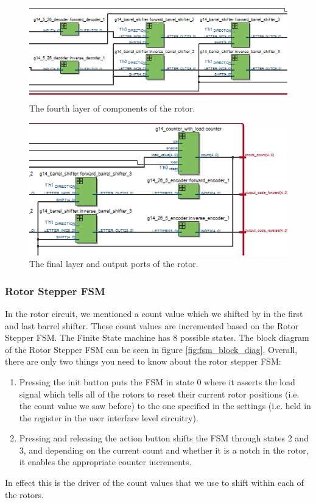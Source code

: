 \documentclass{article}
\begin{document}
\begin{figure}[ht!]
    \centering
    \includegraphics[scale=0.6]{rotor_4.PNG}
    \caption{The fourth layer of components of the rotor.}
    \label{fig:rotor_4}
\end{figure}

\begin{figure}[ht!]
    \centering
    \includegraphics[scale=0.7]{rotor_5.PNG}
    \caption{The final layer and output ports of the rotor. }
    \label{fig:rotor_5}
\end{figure}


\subsubsection{Rotor Stepper FSM}
In the rotor circuit, we mentioned a count value which we shifted by in the first and last barrel shifter. These count values are incremented based on the Rotor Stepper FSM. The Finite State machine has 8 possible states. The block diagram of the Rotor Stepper FSM can be seen in figure \ref{fig:fsm_block_diag}. Overall, there are only two things you need to know about the rotor stepper FSM: 
\begin{enumerate}
    \item Pressing the init button puts the FSM in state 0 where it asserts the load signal which tells all of the rotors to reset their current rotor positions (i.e. the count value we saw before) to the one specified in the settings (i.e. held in the register in the user interface level circuitry). 
    \item Pressing and releasing the action button shifts the FSM through states 2 and 3, and depending on the current count and whether it is a notch in the rotor, it enables the appropriate counter increments. 
\end{enumerate}
In effect this is the driver of the count values that we use to shift within each of the rotors. 
\end{document}
